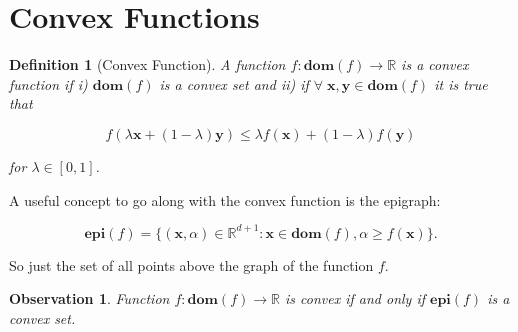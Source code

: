 \documentclass{article}
\newtheorem{definition}[theorem]{Definition}
\newtheorem{observation}[theorem]{Observation}
\begin{document}
\section{Convex Functions}

	\begin{definition}[Convex Function]
		A function $f:\mathbf{dom}(f)\to\mathbb{R}$ is a \textnormal{convex function} if i) $\mathbf{dom}(f)$ is a convex set and ii) if $\forall\;\mathbf{x, y}\in\mathbf{dom}(f)$ it is true that
		
		\[ f(\lambda\mathbf{x} + (1-\lambda)\mathbf{y}) \le \lambda f(\mathbf{x}) + (1-\lambda)f(\mathbf{y})  \]
		
		for $\lambda\in [0, 1]$.
	\end{definition}
	
	A useful concept to go along with the convex function is the epigraph:
	
	\[ \mathbf{epi}(f) = \{ (\mathbf{x}, \alpha) \in\mathbb{R}^{d+1}: \mathbf{x}\in\mathbf{dom}(f), \alpha \ge f(\mathbf{x})\}. \]
		
	So just the set of all points above the graph of the function $f$.
	
	\begin{observation}
		Function $f:\mathbf{dom}(f)\to\mathbb{R}$ is convex if and only if $\mathbf{epi}(f)$ is a convex set.
	\end{observation}
	
\end{document}
